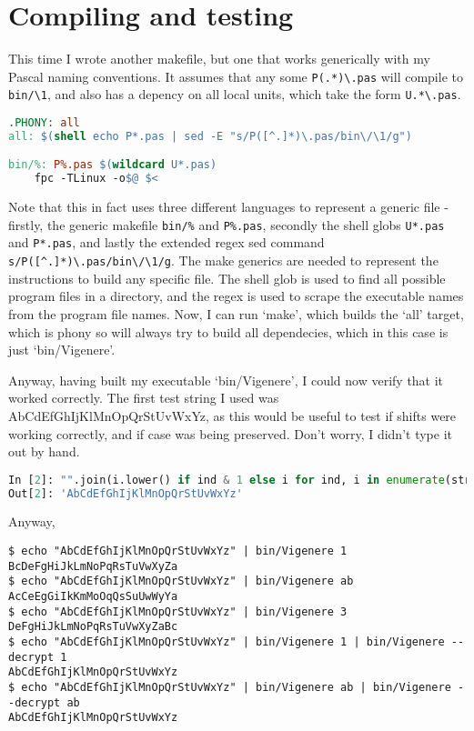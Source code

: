 \documentclass{article}
\begin{document}
    \section{Compiling and testing}

    This time I wrote another makefile, but one that works generically with my
    Pascal naming conventions. It assumes that any some \verb|P(.*)\.pas| will
    compile to \verb|bin/\1|, and also has a depency on all local units, which
    take the form \verb|U.*\.pas|.

\begin{lstlisting}[language=make, caption=The generic FPC makefile]
.PHONY: all
all: $(shell echo P*.pas | sed -E "s/P([^.]*)\.pas/bin\/\1/g")

bin/%: P%.pas $(wildcard U*.pas)
	fpc -TLinux -o$@ $<
\end{lstlisting}
\iffalse $ \fi %

    Note that this in fact uses three different languages to represent a
    generic file - firstly, the generic makefile \verb|bin/%| and
    \verb|P%.pas|, secondly the shell globs \verb|U*.pas| and \verb|P*.pas|,
    and lastly the extended regex sed command \verb|s/P([^.]*)\.pas/bin\/\1/g|.
    The make generics are needed to represent the instructions to build any
    specific file. The shell glob is used to find all possible program files in
    a directory, and the regex is used to scrape the executable names from the
    program file names. Now, I can run `make', which builds the `all' target,
    which is phony so will always try to build all dependecies, which in this
    case is just `bin/Vigenere'.

    Anyway, having built my executable `bin/Vigenere', I could now verify that
    it worked correctly. The first test string I used was
    AbCdEfGhIjKlMnOpQrStUvWxYz, as this would be useful to test if shifts were
    working correctly, and if case was being preserved. Don't worry, I didn't
    type it out by hand.

\begin{lstlisting}[language=Python, caption=Alphabet]
In [2]: "".join(i.lower() if ind & 1 else i for ind, i in enumerate(string.ascii_uppercase))
Out[2]: 'AbCdEfGhIjKlMnOpQrStUvWxYz'
\end{lstlisting}
    
    Anyway,

\begin{lstlisting}[caption=Testing bin/Vigenere]
$ echo "AbCdEfGhIjKlMnOpQrStUvWxYz" | bin/Vigenere 1
BcDeFgHiJkLmNoPqRsTuVwXyZa
$ echo "AbCdEfGhIjKlMnOpQrStUvWxYz" | bin/Vigenere ab
AcCeEgGiIkKmMoOqQsSuUwWyYa
$ echo "AbCdEfGhIjKlMnOpQrStUvWxYz" | bin/Vigenere 3 
DeFgHiJkLmNoPqRsTuVwXyZaBc
$ echo "AbCdEfGhIjKlMnOpQrStUvWxYz" | bin/Vigenere 1 | bin/Vigenere --decrypt 1
AbCdEfGhIjKlMnOpQrStUvWxYz
$ echo "AbCdEfGhIjKlMnOpQrStUvWxYz" | bin/Vigenere ab | bin/Vigenere --decrypt ab
AbCdEfGhIjKlMnOpQrStUvWxYz
\end{lstlisting}
\iffalse $ \fi %
\end{document}

